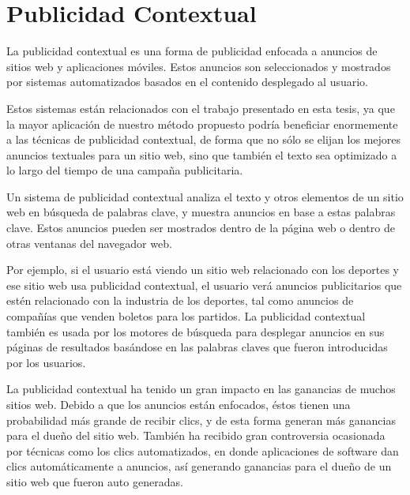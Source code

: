 

\clearpage
\section{Publicidad Contextual}
\label{op-pos}

La publicidad contextual es una forma de publicidad enfocada a
anuncios de sitios web y aplicaciones móviles. Estos anuncios son
seleccionados y mostrados por sistemas automatizados basados en el
contenido desplegado al usuario.

Estos sistemas están relacionados con el trabajo presentado en esta
tesis, ya que la mayor aplicación de nuestro método propuesto podría
beneficiar enormemente a las técnicas de publicidad contextual, de
forma que no sólo se elijan los mejores anuncios textuales para un
sitio web, sino que también el texto sea optimizado a lo largo del
tiempo de una campaña publicitaria.

Un sistema de publicidad contextual analiza el texto y otros elementos
de un sitio web en búsqueda de palabras clave, y muestra anuncios en
base a estas palabras clave. Estos anuncios pueden ser mostrados
dentro de la página web o dentro de otras ventanas del navegador web.

Por ejemplo, si el usuario está viendo un sitio web relacionado con
los deportes y ese sitio web usa publicidad contextual, el usuario
verá anuncios publicitarios que estén relacionado con la industria de
los deportes, tal como anuncios de compañías que venden boletos para
los partidos. La publicidad contextual también es usada por los
motores de búsqueda para desplegar anuncios en sus páginas de
resultados basándose en las palabras claves que fueron introducidas
por los usuarios.

La publicidad contextual ha tenido un gran impacto en las ganancias de
muchos sitios web. Debido a que los anuncios están enfocados, éstos
tienen una probabilidad más grande de recibir clics, y de esta forma
generan más ganancias para el dueño del sitio web. También ha recibido
gran controversia ocasionada por técnicas como los clics
automatizados, en donde aplicaciones de software dan clics
automáticamente a anuncios, así generando ganancias para el dueño de
un sitio web que fueron auto generadas.

